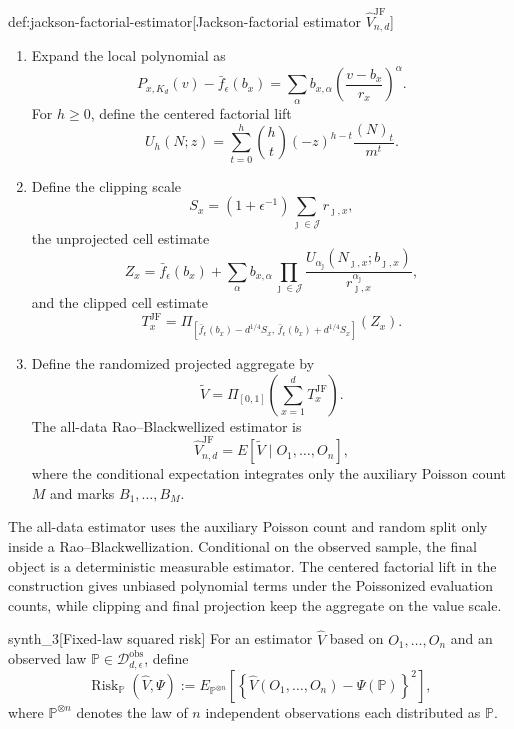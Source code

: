 \documentclass[11pt]{article}
\begin{document}
\begin{algorithmv}{def:jackson-factorial-estimator}[Jackson-factorial estimator \(\widehat V_{n,d}^{\mathrm{JF}}\)]
\begin{enumerate}
\item Expand the local polynomial as
\[
P_{x,K_d}(v)-\bar f_\epsilon(b_x)
=
\sum_\alpha
b_{x,\alpha}
\left(\frac{v-b_x}{r_x}\right)^\alpha .
\]
For \(h\ge 0\), define the centered factorial lift
\[
U_h(N;z)
=
\sum_{t=0}^h
\binom ht
(-z)^{h-t}
\frac{(N)_t}{m^t}.
\]

\item Define the clipping scale
\[
S_x
=
(1+\epsilon^{-1})
\sum_{\jmath\in\mathcal J} r_{\jmath,x},
\]
the unprojected cell estimate
\[
Z_x
=
\bar f_\epsilon(b_x)
+
\sum_\alpha
b_{x,\alpha}
\prod_{\jmath\in\mathcal J}
\frac{
U_{\alpha_{\jmath}}(N_{\jmath,x};b_{\jmath,x})
}{
r_{\jmath,x}^{\alpha_{\jmath}}
},
\]
and the clipped cell estimate
\[
T_x^{\mathrm{JF}}
=
\Pi_{
[\bar f_\epsilon(b_x)-d^{1/4}S_x,\,
 \bar f_\epsilon(b_x)+d^{1/4}S_x]
}
(Z_x).
\]

\item Define the randomized projected aggregate by
\[
\widetilde V
=
\Pi_{[0,1]}
\left(
\sum_{x=1}^d T_x^{\mathrm{JF}}
\right).
\]
The all-data Rao--Blackwellized estimator is
\[
\widehat V_{n,d}^{\mathrm{JF}}
=
E\!\left[
\widetilde V
\mid
O_1,\ldots,O_n
\right],
\]
where the conditional expectation integrates only the auxiliary Poisson count \(M\) and marks \(B_1,\ldots,B_M\).
\end{enumerate}
\end{algorithmv}

The all-data estimator  uses the auxiliary Poisson count  and random split only inside a Rao--Blackwellization. Conditional on the observed sample, the final object is a deterministic measurable estimator. The centered factorial lift in the construction gives unbiased polynomial terms under the Poissonized evaluation counts, while clipping and final projection keep the aggregate on the value scale.

\begin{definitionv}{synth_3}[Fixed-law squared risk]
For an estimator \(\widehat V\) based on \(O_1,\ldots,O_n\) and an observed law \(\mathbb P\in\mathcal D_{d,\epsilon}^{\mathrm{obs}}\), define \[ \operatorname{Risk}_{\mathbb P}(\widehat V,\Psi):=E_{\mathbb P^{\otimes n}}\left[\left\{\widehat V(O_1,\ldots,O_n)-\Psi(\mathbb P)\right\}^2\right], \] where \(\mathbb P^{\otimes n}\) denotes the law of \(n\) independent observations each distributed as \(\mathbb P\).
\end{definitionv}
\end{document}

